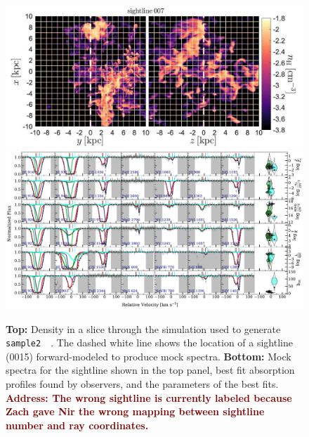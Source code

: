 \documentclass[fleqn,usenatbib]{mnras}
\newcommand{\todo}[1]{\textcolor{Maroon}{\textbf{Address: #1}}}
\begin{document}
\begin{figure}
    \centering
    \includegraphics[width=\textwidth]{figures/sample2/projections/projection_0015.jpg}
    \includegraphics[width=\textwidth]{figures/sample2/best_fits/0015.pdf}
    \caption{
    \textbf{Top:}
    Density in a slice through the simulation used to generate \texttt{sample2}~~\citep{Mandelker2020a}.
    The dashed white line shows the location of a sightline (0015) forward-modeled to produce mock spectra.
    \textbf{Bottom:}
    Mock spectra for the sightline shown in the top panel,
    best fit absorption profiles found by observers,
    and the parameters of the best fits.
    \todo{The wrong sightline is currently labeled because Zach gave Nir the wrong mapping between sightline number and ray coordinates.}
    }
    \label{f: sample2 spectrum 15}
    \end{figure}
\end{document}
